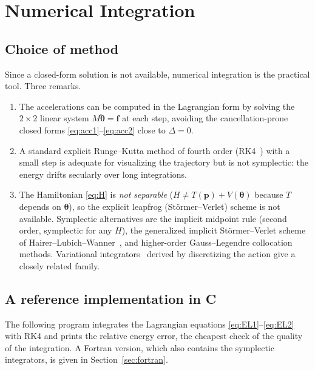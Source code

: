 \documentclass[11pt,a4paper]{book}
\theoremstyle{definition}
\theoremstyle{remark}
\begin{document}
\section{Numerical Integration}
\label{sec:numerics}

\subsection{Choice of method}

Since a closed-form solution is not available, numerical integration is the practical tool. Three remarks.

\begin{enumerate}
  \item The accelerations can be computed in the Lagrangian form by solving the $2\times2$ linear system
        $M\ddot{\bm\theta}=\bm f$ at each step, avoiding the cancellation-prone closed forms
        \eqref{eq:acc1}--\eqref{eq:acc2} close to $\Delta=0$.
  \item A standard explicit Runge--Kutta method of fourth order (RK4~\cite{hnw}) with a small step is adequate for visualizing
        the trajectory but is not symplectic: the energy drifts secularly over long integrations.
  \item The Hamiltonian \eqref{eq:H} is \emph{not separable} ($H\ne T(\bm p)+V(\bm\theta)$ because $T$ depends on
        $\bm\theta$), so the explicit leapfrog (St\"ormer--Verlet) scheme is not available. Symplectic alternatives are
        the implicit midpoint rule (second order, symplectic for any $H$), the generalized implicit St\"ormer--Verlet
        scheme of Hairer--Lubich--Wanner~\cite{ghw}, and higher-order Gauss--Legendre collocation methods. Variational integrators~\cite{marsdenwest}
        derived by discretizing the action give a closely related family.
\end{enumerate}

\subsection{A reference implementation in C}

The following program integrates the Lagrangian equations \eqref{eq:EL1}--\eqref{eq:EL2} with RK4 and prints the
relative energy error, the cheapest check of the quality of the integration. A Fortran version, which also
contains the symplectic integrators, is given in Section~\ref{sec:fortran}.
\end{document}
